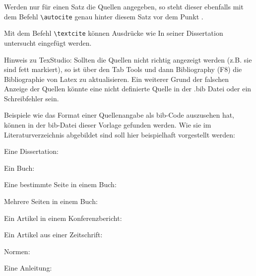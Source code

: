 Werden nur für einen Satz die Quellen angegeben, so steht dieser ebenfalls mit dem Befehl \verb|\autocite| genau hinter diesem Satz vor dem Punkt \autocite{Diss_Fottner}.

Mit dem Befehl \verb|\textcite| können Ausdrücke wie \glqq In seiner Dissertation untersucht \textcite{Diss_Fottner}\grqq{} eingefügt werden.

Hinweis zu TexStudio: Sollten die Quellen nicht richtig angezeigt werden (z.B. sie sind fett markiert), so ist über den Tab \glqq Tools\grqq{} und dann Bibliography (F8) die Bibliographie von Latex zu aktualisieren. Ein weiterer Grund der falschen Anzeige der Quellen könnte eine nicht definierte Quelle in der .bib Datei oder ein  Schreibfehler sein.
\newpage

Beispiele wie das Format einer Quellenangabe als bib-Code auszusehen hat, können in der bib-Datei dieser Vorlage gefunden werden. Wie sie im Literaturverzeichnis abgebildet sind soll hier beispielhaft vorgestellt werden:

Eine Dissertation: \autocite{Diss_Fottner}

Ein Buch: \autocite{Ewins}

Eine bestimmte Seite in einem Buch: \autocite[789]{Ewins}

Mehrere Seiten in einem Buch: \autocite[789--791]{Ewins}

Ein Artikel in einem Konferenzbericht: \autocite{Sch-2012}

Ein Artikel aus einer Zeitschrift: \autocite{Cel-1997}

Normen: \autocite{DIN15018T3,EN12999, ISO8686T1}

Eine Anleitung: \autocite{NODYA}
